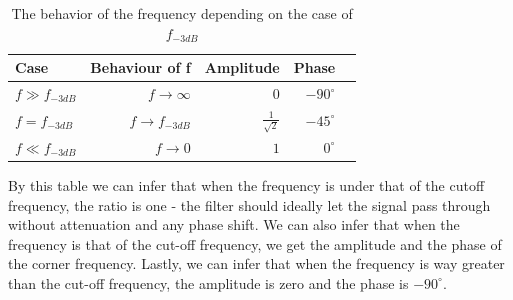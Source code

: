 \begin{table}[!htp]\centering
    \scriptsize
    \begin{tabular}{lrrrr}\toprule
        Case             & Behaviour of f   & Amplitude            & Phase         \\\midrule
        $f \gg f_{-3dB}$ & $f \to \infty$   & $0$                  & $-90^{\circ}$ \\
        $f = f_{-3dB}$   & $f \to f_{-3dB}$ & $\frac{1}{\sqrt{2}}$ & $-45^{\circ}$ \\
        $f \ll f_{-3dB}$ & $f \to 0$        & $1$                  & $0^{\circ}$   \\
        \bottomrule
    \end{tabular}
    \caption{The behavior of the frequency depending on the case of $f_{-3dB}$}\label{tab: }
\end{table}
By this table we can infer that when the frequency is under that of the cutoff frequency, the ratio is one - the filter should ideally let the signal pass through without attenuation and any phase shift.
We can also infer that when the frequency is that of the cut-off frequency, we get the amplitude and the phase of the corner frequency.
Lastly, we can infer that when the frequency is way greater than the cut-off frequency, the amplitude is zero and the phase is $-90^{\circ}$.